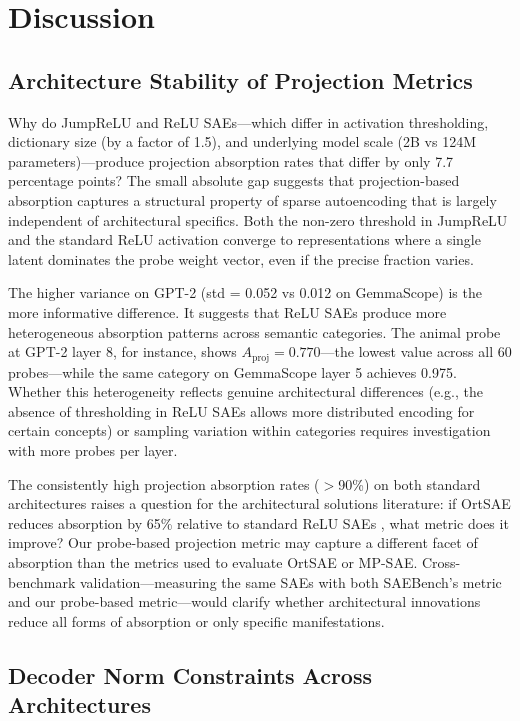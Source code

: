 \documentclass{article}
\begin{document}
\section{Discussion}
\label{sec:discussion}

\subsection{Architecture Stability of Projection Metrics}

Why do JumpReLU and ReLU SAEs---which differ in activation thresholding, dictionary size (by a factor of 1.5), and underlying model scale (2B vs 124M parameters)---produce projection absorption rates that differ by only 7.7 percentage points? The small absolute gap suggests that projection-based absorption captures a structural property of sparse autoencoding that is largely independent of architectural specifics. Both the non-zero threshold in JumpReLU and the standard ReLU activation converge to representations where a single latent dominates the probe weight vector, even if the precise fraction varies.

The higher variance on GPT-2 (std = 0.052 vs 0.012 on GemmaScope) is the more informative difference. It suggests that ReLU SAEs produce more heterogeneous absorption patterns across semantic categories. The animal probe at GPT-2 layer 8, for instance, shows $A_{\text{proj}} = 0.770$---the lowest value across all 60 probes---while the same category on GemmaScope layer 5 achieves 0.975. Whether this heterogeneity reflects genuine architectural differences (e.g., the absence of thresholding in ReLU SAEs allows more distributed encoding for certain concepts) or sampling variation within categories requires investigation with more probes per layer.

The consistently high projection absorption rates ($>$90\%) on both standard architectures raises a question for the architectural solutions literature: if OrtSAE reduces absorption by 65\% relative to standard ReLU SAEs \citep{korznikov2025ortsae}, what metric does it improve? Our probe-based projection metric may capture a different facet of absorption than the metrics used to evaluate OrtSAE or MP-SAE. Cross-benchmark validation---measuring the same SAEs with both SAEBench's metric and our probe-based metric---would clarify whether architectural innovations reduce all forms of absorption or only specific manifestations.

\subsection{Decoder Norm Constraints Across Architectures}
\end{document}
